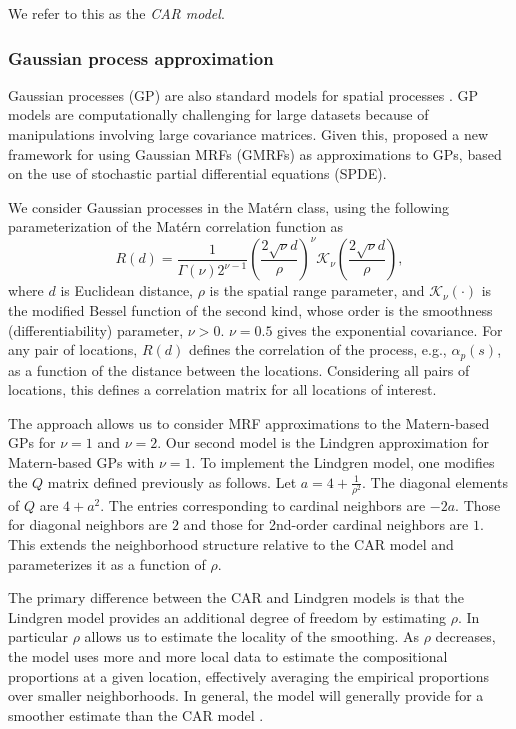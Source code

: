 \documentclass[12pt]{article}\usepackage[]{graphicx}\usepackage[]{color}
\newcommand{\matern}{Mat\'{e}rn }
\begin{document}
We refer to this as the \emph{CAR model}.


\subsubsection{Gaussian process approximation}

Gaussian processes (GP) are also standard models for spatial processes \citep{Bane:etal:2003}.
GP models are computationally challenging for large datasets because
of manipulations involving large covariance matrices. Given this,
\cite{Lind:etal:2011} proposed a new framework for using Gaussian
MRFs (GMRFs) as approximations to GPs, based on the use of stochastic
partial differential equations (SPDE).

We consider Gaussian processes in the \matern class, using the following
parameterization of the \matern correlation function as 
\begin{equation}
R(d)=\frac{1}{\Gamma(\nu)2^{\nu-1}}\left(\frac{2\sqrt{\nu}d}{\rho}\right)^{\nu}\mathcal{K}_{\nu}\left(\frac{2\sqrt{\nu}d}{\rho}\right),\label{eq:Matern}
\end{equation}
where $d$ is Euclidean distance, $\rho$ is the spatial range parameter,
and $\mathcal{K}_{\nu}(\cdot)$ is the modified Bessel function of
the second kind, whose order is the smoothness (differentiability)
parameter, $\nu>0$. $\nu=0.5$ gives the exponential covariance.
For any pair of locations, $R(d)$ defines the correlation of the
process, e.g., $\alpha_{p}(s)$, as a function of the distance between
the locations. Considering all pairs of locations, this defines a
correlation matrix for all locations of interest. 

The \citet{Lind:etal:2011} approach allows us to consider MRF approximations
to the Matern-based GPs for $\nu=1$ and $\nu=2$. Our second model
is the Lindgren approximation for Matern-based GPs with $\nu=1$.
To implement the Lindgren model, one modifies the $Q$ matrix defined
previously as follows. Let $a=4+\frac{1}{\rho^{2}}$. The diagonal
elements of $Q$ are $4+a^{2}$. The entries corresponding to cardinal
neighbors are $-2a$. Those for diagonal neighbors are $2$ and those
for 2nd-order cardinal neighbors are $1$. This extends the neighborhood
structure relative to the CAR model and parameterizes it as a function
of $\rho$.

The primary difference between the CAR and Lindgren models is that
the Lindgren model provides an additional degree of freedom by estimating
$\rho$. In particular $\rho$ allows us to estimate the locality
of the smoothing. As $\rho$ decreases, the model uses more and more
local data to estimate the compositional proportions at a given location,
effectively averaging the empirical proportions over smaller neighborhoods.
In general, the \cite{Lind:etal:2011} model will generally provide
for a smoother estimate than the CAR model \citep{Paci:2013}. 
\end{document}
